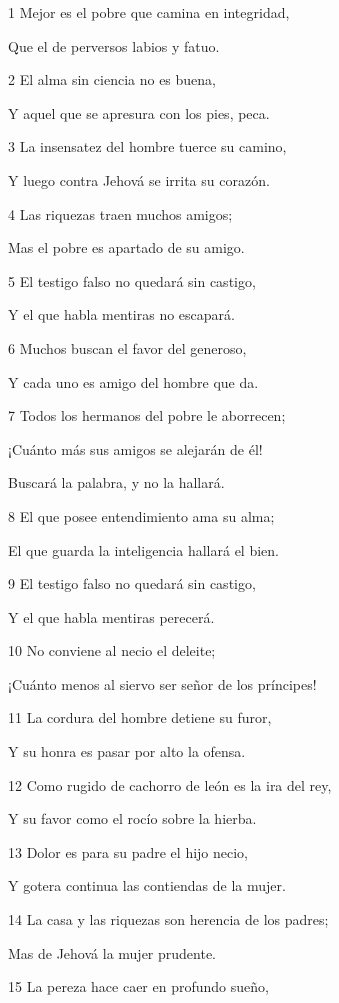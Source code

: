 \par 1 Mejor es el pobre que camina en integridad,
\par Que el de perversos labios y fatuo.
\par 2 El alma sin ciencia no es buena,
\par Y aquel que se apresura con los pies, peca.
\par 3 La insensatez del hombre tuerce su camino,
\par Y luego contra Jehová se irrita su corazón.
\par 4 Las riquezas traen muchos amigos;
\par Mas el pobre es apartado de su amigo.
\par 5 El testigo falso no quedará sin castigo,
\par Y el que habla mentiras no escapará.
\par 6 Muchos buscan el favor del generoso,
\par Y cada uno es amigo del hombre que da.
\par 7 Todos los hermanos del pobre le aborrecen;
\par ¡Cuánto más sus amigos se alejarán de él!
\par Buscará la palabra, y no la hallará.
\par 8 El que posee entendimiento ama su alma;
\par El que guarda la inteligencia hallará el bien.
\par 9 El testigo falso no quedará sin castigo,
\par Y el que habla mentiras perecerá.
\par 10 No conviene al necio el deleite;
\par ¡Cuánto menos al siervo ser señor de los príncipes!
\par 11 La cordura del hombre detiene su furor,
\par Y su honra es pasar por alto la ofensa.
\par 12 Como rugido de cachorro de león es la ira del rey,
\par Y su favor como el rocío sobre la hierba.
\par 13 Dolor es para su padre el hijo necio,
\par Y gotera continua las contiendas de la mujer.
\par 14 La casa y las riquezas son herencia de los padres;
\par Mas de Jehová la mujer prudente.
\par 15 La pereza hace caer en profundo sueño,

